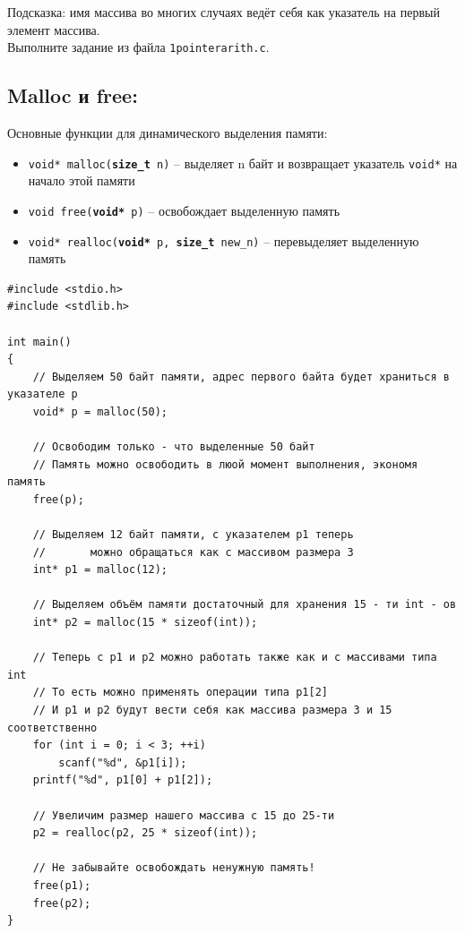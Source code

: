 \documentclass{article}
\begin{document}
Подсказка: имя массива во многих случаях ведёт себя как указатель на первый элемент массива. \\
Выполните задание из файла \texttt{1pointerarith.c}.

\subsection*{Malloc и free:}
Основные функции для динамического выделения памяти:
\begin{itemize}
\item \texttt{void* malloc(\textbf{size\_t} n)} -- выделяет n байт и возвращает указатель \texttt{void*}
на начало этой памяти \\
\item \texttt{void free(\textbf{void*} p)} -- освобождает выделенную память\\
\item \texttt{void* realloc(\textbf{void*} p, \textbf{size\_t} new\_n)} -- перевыделяет выделенную память\\
\end{itemize}
\begin{lstlisting}
#include <stdio.h>
#include <stdlib.h>

int main()
{
	// Выделяем 50 байт памяти, адрес первого байта будет храниться в указателе p
	void* p = malloc(50); 
	
	// Освободим только - что выделенные 50 байт
	// Память можно освободить в люой момент выполнения, экономя память
	free(p);              

	// Выделяем 12 байт памяти, с указателем p1 теперь
	//       можно обращаться как с массивом размера 3
	int* p1 = malloc(12); 
    
	// Выделяем объём памяти достаточный для хранения 15 - ти int - ов
	int* p2 = malloc(15 * sizeof(int)); 

	// Теперь с p1 и p2 можно работать также как и с массивами типа int
	// То есть можно применять операции типа p1[2]
	// И p1 и p2 будут вести себя как массива размера 3 и 15 соответственно
	for (int i = 0; i < 3; ++i)
		scanf("%d", &p1[i]);
	printf("%d", p1[0] + p1[2]);
	
	// Увеличим размер нашего массива с 15 до 25-ти
	p2 = realloc(p2, 25 * sizeof(int)); 
	
	// Не забывайте освобождать ненужную память!
	free(p1);
	free(p2);
}
\end{lstlisting}
\end{document}
